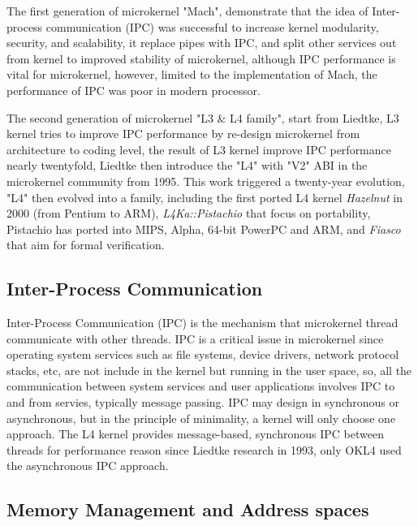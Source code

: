 \documentclass[10pt,preprint,nocopyrightspace]{sigplanconf}
\begin{document}
The first generation of microkernel "Mach", demonstrate that the idea of Inter-process communication (IPC) was successful to increase kernel modularity, security, and scalability, it replace pipes with IPC, and split other services out from kernel to improved stability of microkernel, although IPC performance is vital for microkernel, however, limited to the implementation of Mach, the performance of IPC was poor in modern processor\cite{liedtke1993improving}.

The second generation of microkernel "L3 \& L4 family", start from Liedtke\cite{liedtke1993improving}, L3 kernel tries to improve IPC performance by re-design microkernel from architecture to coding level, the result of L3 kernel improve IPC performance nearly twentyfold, Liedtke then introduce the "L4" with "V2" ABI in the microkernel community from 1995\cite{liedtke1995u}. This work triggered a twenty-year evolution, "L4" then evolved into a family, including the first ported L4 kernel \textit{Hazelnut} in 2000 (from Pentium to ARM), \textit{L4Ka::Pistachio} that focus on portability, Pistachio has ported into MIPS, Alpha, 64-bit PowerPC and ARM, and \textit{Fiasco} that aim for formal verification.

\subsection{Inter-Process Communication}

Inter-Process Communication (IPC) is the mechanism that microkernel thread communicate with other threads\cite{liedtke1993improving}. IPC is a critical issue in microkernel since operating system services such as file systems, device drivers, network protocol stacks, etc, are not include in the kernel but running in the user space, so, all the communication between system services and user applications involves IPC to and from servies\cite{iqbal2010overview}, typically message passing. IPC may design in synchronous or asynchronous, but in the principle of minimality, a kernel will only choose one approach. The L4 kernel provides message-based, synchronous IPC between threads for performance reason since Liedtke research in 1993\cite{liedtke1993improving}, only OKL4 used the asynchronous IPC approach\cite{elphinstone2013l3}.

\subsection{Memory Management and Address spaces}
\end{document}
